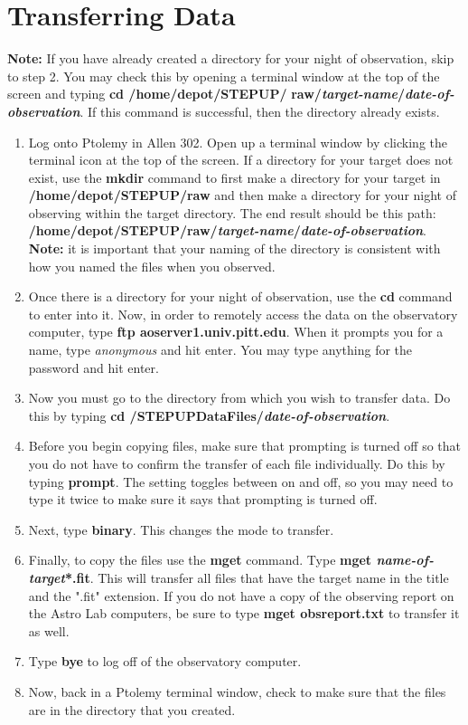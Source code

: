 \documentclass[11pt]{report}
\begin{document}
\section{Transferring Data}
{\bf Note:} If you have already created a directory for your night of observation, skip to step 2. You may check this by opening a terminal window at the top of the screen and typing {\bf cd /home/depot/STEPUP/} {\bf raw/\emph{target-name}/\emph{date-of-observation}}. If this command is successful, then the directory already exists.
\begin{enumerate}

\item Log onto Ptolemy in Allen 302. Open up a terminal window by clicking the terminal icon at the top of the screen. If a directory for your target does not exist, use the {\bf mkdir} command to first make a directory for your target in {\bf /home/depot/STEPUP/raw} and then make a directory for your night of observing within the target directory. The end result should be this path: {\bf /home/depot/STEPUP/raw/\emph{target-name}/\emph{date-of-observation}}. {\bf Note:} it is important that your naming of the directory is consistent with how you named the files when you observed. 
\item Once there is a directory for your night of observation, use the {\bf cd} command to enter into it. Now, in order to remotely access the data on the observatory computer, type {\bf ftp aoserver1.univ.pitt.edu}. When it prompts you for a name, type \emph{anonymous} and hit enter. You may type anything for the password and hit enter.
\item Now you must go to the directory from which you wish to transfer data. Do this by typing {\bf cd /STEPUPDataFiles/\emph{date-of-observation}}.
\item Before you begin copying files, make sure that prompting is turned off so that you do not have to confirm the transfer of each file individually. Do this by typing {\bf prompt}. The setting toggles between on and off, so you may need to type it twice to make sure it says that prompting is turned off.
\item Next, type {\bf binary}. This changes the mode to transfer.
\item Finally, to copy the files use the {\bf mget} command. Type {\bf mget \emph{name-of-target}*.fit}. This will transfer all files that have the target name in the title and the ".fit" extension. If you do not have a copy of the observing report on the Astro Lab computers, be sure to type {\bf mget obsreport.txt} to transfer it as well. 
\item Type {\bf bye} to log off of the observatory computer.
\item Now, back in a Ptolemy terminal window, check to make sure that the files are in the directory that you created. 
\end{enumerate}
\end{document}
